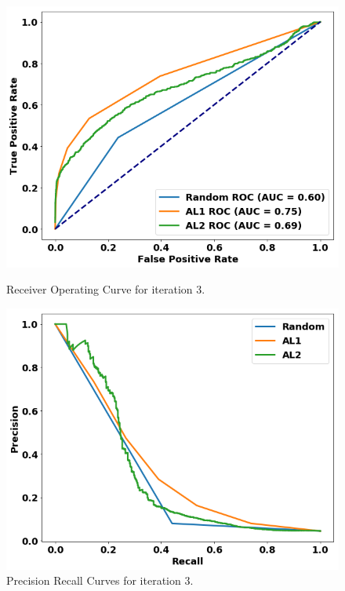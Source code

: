 \begin{figure}
\centering
\begin{minipage}[b]{.4\textwidth}
\includegraphics[trim=0in 0.1in 0.1in 0.in,clip,width=1.0\textwidth]{figures/rocs_round4.png}
\captionsetup{labelformat=empty}
\caption{Receiver Operating Curve for iteration 3.}\label{fig:roc_round4}
\end{minipage}\qquad
\begin{minipage}[b]{.4\textwidth}
\includegraphics[trim=0in 0.1in 0.1in 0.in,clip,width=1.0\textwidth]{figures/prcs_round4.png}
\captionsetup{labelformat=empty}
\caption{Precision Recall Curves for iteration 3.}\label{fig:prcs_round4}
\end{minipage}


\end{figure}
